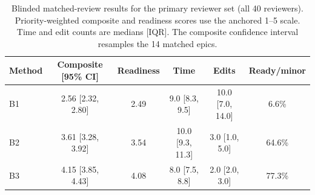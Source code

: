 \begin{table}[t]
\caption{Blinded matched-review results for the primary reviewer set (all 40 reviewers). Priority-weighted composite and readiness scores use the anchored 1--5 scale. Time and edit counts are medians [IQR]. The composite confidence interval resamples the 14 matched epics.}
\label{tab:matched-review-method-summary}
\centering
\small
\begin{tabular}{lccccc}
\toprule
Method & Composite [95\% CI] & Readiness & Time & Edits & Ready/minor \\ 
\midrule
B1 & 2.56 [2.32, 2.80] & 2.49 & 9.0 [8.3, 9.5] & 10.0 [7.0, 14.0] & 6.6\% \\
B2 & 3.61 [3.28, 3.92] & 3.54 & 10.0 [9.3, 11.3] & 3.0 [1.0, 5.0] & 64.6\% \\
B3 & 4.15 [3.85, 4.43] & 4.08 & 8.0 [7.5, 8.8] & 2.0 [2.0, 3.0] & 77.3\% \\
\bottomrule
\end{tabular}
\end{table}
